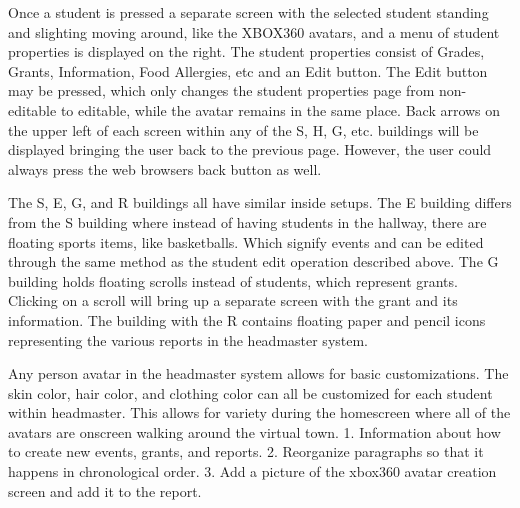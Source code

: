 \documentclass[11pt]{article}
\begin{document}
Once a student is pressed a separate screen with the selected student standing and slighting moving around, like the XBOX360 avatars, and a menu of student properties is displayed on the right. The student properties consist of Grades, Grants, Information, Food Allergies, etc and an Edit button. The Edit button may be pressed, which only changes the student properties page from non-editable to editable, while the avatar remains in the same place. Back arrows on the upper left of each screen within any of the S, H, G, etc. buildings will be displayed bringing the user back to the previous page. However, the user could always press the web browsers back button as well.

The S, E, G, and R buildings all have similar inside setups. The E building differs from the S building where instead of having students in the hallway, there are floating sports items, like basketballs. Which signify events and can be edited through the same method as the student edit operation described above. The G building holds floating scrolls instead of students, which represent grants. Clicking on a scroll will bring up a separate screen with the grant and its information. The building with the R contains floating paper and pencil icons representing the various reports in the headmaster system. 

Any person avatar in the headmaster system allows for basic customizations. The skin color, hair color, and clothing color can all be customized for each student within headmaster. This allows for variety during the homescreen where all of the avatars are onscreen walking around the virtual town.
   1. Information about how to create new events, grants, and reports.
   2. Reorganize paragraphs so that it happens in chronological order.
   3. Add a picture of the xbox360 avatar creation screen and add it to the report.
\end{document}
